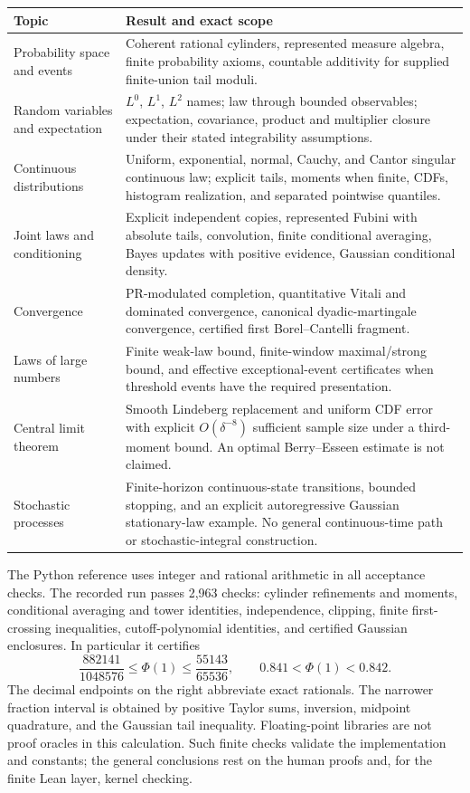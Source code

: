 \begin{longtable}{>{\raggedright\arraybackslash}p{}>{\raggedright\arraybackslash}p{}}
\toprule
Topic & Result and exact scope\\
\midrule\endhead
Probability space and events & Coherent rational cylinders, represented
measure algebra, finite probability axioms, countable additivity for
supplied finite-union tail moduli.\\
Random variables and expectation & $L^0$, $L^1$, $L^2$ names; law through
bounded observables; expectation, covariance, product and multiplier
closure under their stated integrability assumptions.\\
Continuous distributions & Uniform, exponential, normal, Cauchy, and Cantor
singular continuous law; explicit tails, moments when finite, CDFs,
histogram realization, and separated pointwise quantiles.\\
Joint laws and conditioning & Explicit independent copies, represented
Fubini with absolute tails, convolution, finite conditional averaging,
Bayes updates with positive evidence, Gaussian conditional density.\\
Convergence & PR-modulated completion, quantitative Vitali and dominated
convergence, canonical dyadic-martingale convergence, certified first
Borel--Cantelli fragment.\\
Laws of large numbers & Finite weak-law bound, finite-window maximal/strong
bound, and effective exceptional-event certificates when threshold events
have the required presentation.\\
Central limit theorem & Smooth Lindeberg replacement and uniform CDF error
with explicit $O(\delta^{-8})$ sufficient sample size under a third-moment
bound. An optimal Berry--Esseen estimate is not claimed.\\
Stochastic processes & Finite-horizon continuous-state transitions, bounded
stopping, and an explicit autoregressive Gaussian stationary-law example.
No general continuous-time path or stochastic-integral construction.\\
\bottomrule
\end{longtable}

The Python reference uses integer and rational arithmetic in all acceptance
checks. The recorded run passes 2,963 checks: cylinder refinements and
moments, conditional averaging and tower identities, independence,
clipping, finite first-crossing inequalities, cutoff-polynomial identities,
and certified Gaussian enclosures. In particular it certifies
\[
 \frac{882141}{1048576}\le\Phi(1)\le\frac{55143}{65536},
 \qquad 0.841<\Phi(1)<0.842.
\]
The decimal endpoints on the right abbreviate exact rationals. The narrower
fraction interval is obtained by positive Taylor sums, inversion, midpoint
quadrature, and the Gaussian tail inequality. Floating-point libraries are
not proof oracles in this calculation. Such finite checks validate the
implementation and constants; the general conclusions rest on the human
proofs and, for the finite Lean layer, kernel checking.

